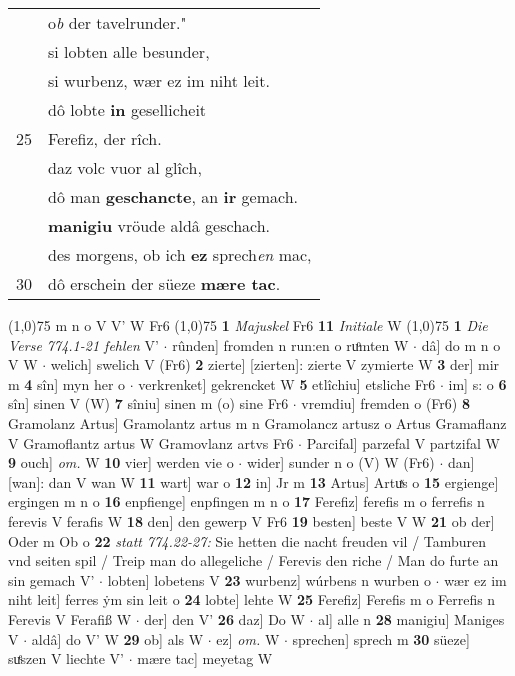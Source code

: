 \documentclass[8pt,a4paper,notitlepage]{article}
\begin{document}
\begin{table}[ht]
\begin{minipage}[t]{0.5\linewidth}
\begin{tabular}{rl}
 & o\textit{b} der tavelrunder."\\ 
 & si lobten alle besunder,\\ 
 & si wurbenz, wær ez im niht leit.\\ 
 & dô lobte \textbf{in} gesellicheit\\ 
25 & Ferefiz, der rîch.\\ 
 & daz volc vuor al glîch,\\ 
 & dô man \textbf{geschancte}, an \textbf{ir} gemach.\\ 
 & \textbf{manigiu} vröude aldâ geschach.\\ 
 & des morgens, ob ich \textbf{ez} sprech\textit{en} mac,\\ 
30 & dô erschein der süeze \textbf{mære tac}.\\ 
\end{tabular}
\scriptsize
\line(1,0){75} \newline
m n o V V' W Fr6 \newline
\line(1,0){75} \newline
\textbf{1} \textit{Majuskel} Fr6  \textbf{11} \textit{Initiale} W  \newline
\line(1,0){75} \newline
\textbf{1} \textit{Die Verse 774.1-21 fehlen} V'   $\cdot$ rûnden] fromden n run:en o ruͦmten W  $\cdot$ dâ] do m n o V W  $\cdot$ welich] swelich V (Fr6) \textbf{2} zierte] [zierten]: zierte V zymierte W \textbf{3} der] mir m \textbf{4} sîn] myn her o  $\cdot$ verkrenket] gekrencket W \textbf{5} etlîchiu] etsliche Fr6  $\cdot$ im] s: o \textbf{6} sîn] sinen V (W) \textbf{7} sîniu] sinen m (o) sine Fr6  $\cdot$ vremdiu] fremden o (Fr6) \textbf{8} Gramolanz Artus] Gramolantz artus m n Gramolancz artusz o Artus Gramaflanz V Gramoflantz artus W Gramovlanz artvs Fr6  $\cdot$ Parcifal] parzefal V partzifal W \textbf{9} ouch] \textit{om.} W \textbf{10} vier] werden vie o  $\cdot$ wider] sunder n o (V) W (Fr6)  $\cdot$ dan] [wan]: dan V wan W \textbf{11} wart] war o \textbf{12} in] Jr m \textbf{13} Artus] Artuͯs o \textbf{15} ergienge] ergingen m n o \textbf{16} enpfienge] enpfingen m n o \textbf{17} Ferefiz] ferefis m o ferrefis n ferevis V ferafis W \textbf{18} den] den gewerp V Fr6 \textbf{19} besten] beste V W \textbf{21} ob der] Oder m Ob o \textbf{22} \textit{statt 774.22-27:} Sie hetten die nacht freuden vil / Tamburen vnd seiten spil / Treip man do allegeliche / Ferevis den riche / Man do furte an sin gemach V'   $\cdot$ lobten] lobetens V \textbf{23} wurbenz] wúrbens n wurben o  $\cdot$ wær ez im niht leit] ferres ẏm sin leit o \textbf{24} lobte] lehte W \textbf{25} Ferefiz] Ferefis m o Ferrefis n Ferevis V Ferafiß W  $\cdot$ der] den V' \textbf{26} daz] Do W  $\cdot$ al] alle n \textbf{28} manigiu] Maniges V  $\cdot$ aldâ] do V' W \textbf{29} ob] als W  $\cdot$ ez] \textit{om.} W  $\cdot$ sprechen] sprech m \textbf{30} süeze] suͤszen V liechte V'  $\cdot$ mære tac] meyetag W \newline
\end{minipage}
\end{table}
\end{document}

